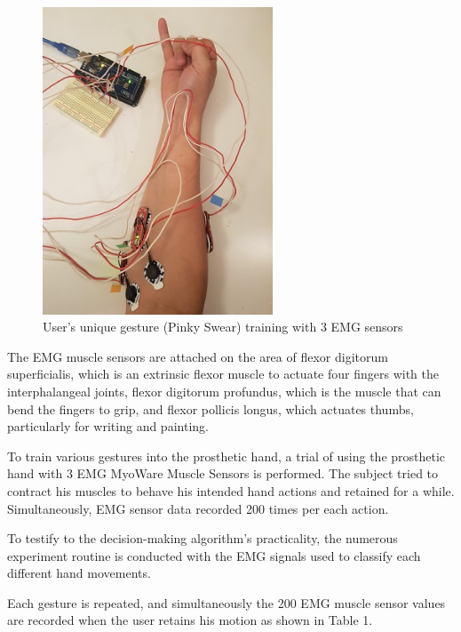 \documentclass[conference]{IEEEtran}
\begin{document}
\begin{figure}[h]
  \centering
  \includegraphics[width=2.7in]{am.jpg}
  \caption{User's unique gesture (Pinky Swear) training with 3 EMG sensors}
  \label{pic}
\end{figure}

The EMG muscle sensors are attached on the area of flexor digitorum superficialis, which is an extrinsic flexor muscle to actuate four fingers with the interphalangeal joints, flexor digitorum profundus, which is the muscle that can bend the fingers to grip, and flexor pollicis longus, which actuates thumbs, particularly for writing and painting.

To train various gestures into the prosthetic hand, a trial of using the prosthetic hand with 3 EMG MyoWare Muscle Sensors is performed. The subject tried to contract his muscles to behave his intended hand actions and retained for a while. Simultaneously, EMG sensor data recorded 200 times per each action.

To testify to the decision-making algorithm's practicality, the numerous experiment routine is conducted with the EMG signals used to classify each different hand movements.


Each gesture is repeated, and simultaneously the 200 EMG muscle sensor values are recorded when the user retains his motion as shown in Table 1.
\end{document}

